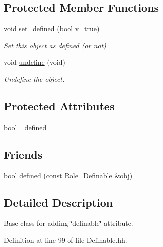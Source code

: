 \subsection*{Protected Member Functions}
\begin{DoxyCompactItemize}
\item 
void \hyperlink{class_photo_finish_1_1_role___definable_a46b347b0aa7883db6fa3b96eefb5851e}{set\+\_\+defined} (bool v=true)
\begin{DoxyCompactList}\small\item\em Set this object as \textquotesingle{}defined\textquotesingle{} (or not) \end{DoxyCompactList}\item 
void \hyperlink{class_photo_finish_1_1_role___definable_af0643f6d11f4444faacd2f4e325d3c0d}{undefine} (void)
\begin{DoxyCompactList}\small\item\em Undefine the object. \end{DoxyCompactList}\end{DoxyCompactItemize}
\subsection*{Protected Attributes}
\begin{DoxyCompactItemize}
\item 
bool \hyperlink{class_photo_finish_1_1_role___definable_afed38bcd4ba076f41f178faad8ed265d}{\+\_\+defined}
\end{DoxyCompactItemize}
\subsection*{Friends}
\begin{DoxyCompactItemize}
\item 
bool \hyperlink{class_photo_finish_1_1_role___definable_a70a3dc85deecd392aac531f24a4b5ca1}{defined} (const \hyperlink{class_photo_finish_1_1_role___definable}{Role\+\_\+\+Definable} \&obj)
\end{DoxyCompactItemize}


\subsection{Detailed Description}
Base class for adding \char`\"{}definable\char`\"{} attribute. 

Definition at line 99 of file Definable.\+hh.




